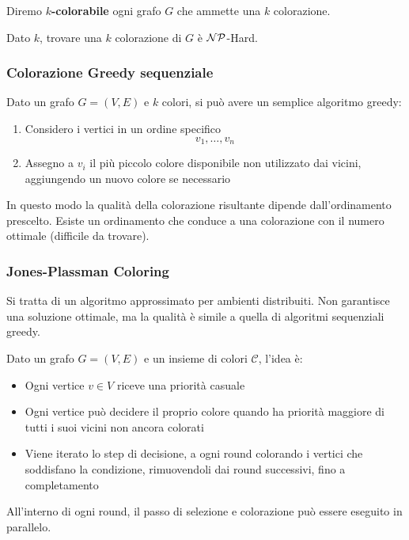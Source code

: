 Diremo \textbf{$k$-colorabile} ogni grafo $G$ che ammette una $k$ colorazione.

Dato $k$, trovare una $k$ colorazione di $G$ è $\mathcal{NP}$-Hard.

\subsubsection{Colorazione Greedy sequenziale}

Dato un grafo $G = (V,E)$ e $k$ colori, si può avere un semplice algoritmo greedy:
\begin{enumerate}
    \item Considero i vertici in un ordine specifico
    $$ v_1, \dots, v_n $$
    
    \item Assegno a $v_i$ il più piccolo colore disponibile non utilizzato dai vicini, aggiungendo un nuovo colore se necessario
\end{enumerate}

In questo modo la qualità della colorazione risultante dipende dall'ordinamento prescelto. Esiste un ordinamento che conduce a una colorazione con il numero ottimale (difficile da trovare).

\subsubsection{Jones-Plassman Coloring}

Si tratta di un algoritmo approssimato per ambienti distribuiti. Non garantisce una soluzione ottimale, ma la qualità è simile a quella di algoritmi sequenziali greedy.

Dato un grafo $G = (V,E)$ e un insieme di colori $\mathcal{C}$, l'idea è:
\begin{itemize}
    \item Ogni vertice $v \in V$ riceve una priorità casuale
    
    \item Ogni vertice può decidere il proprio colore quando ha priorità maggiore di tutti i suoi vicini non ancora colorati
    
    \item Viene iterato lo step di decisione, a ogni round colorando i vertici che soddisfano la condizione, rimuovendoli dai round successivi, fino a completamento 
\end{itemize}

All'interno di ogni round, il passo di selezione e colorazione può essere eseguito in parallelo. 


